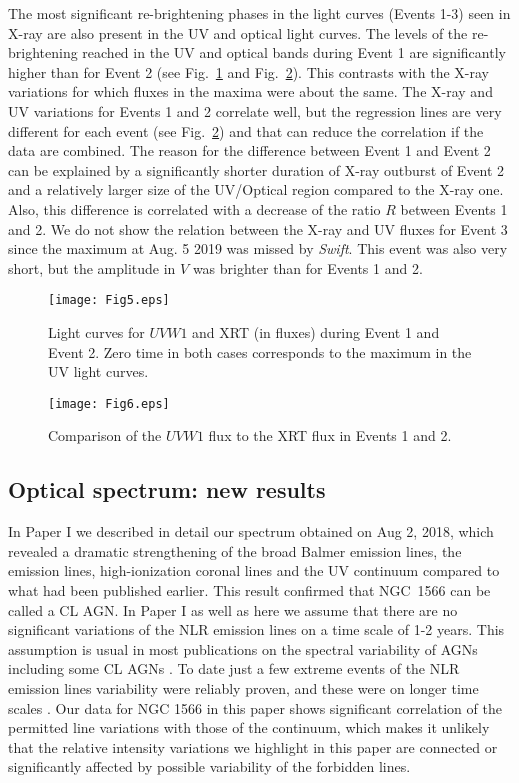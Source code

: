 \documentclass[fleqn,usenatbib]{mnras}
\begin{document}
The most significant re-brightening phases in the light curves  (Events 1-3) seen in X-ray are also present in the UV and optical light curves. The  levels of the re-brightening reached in the UV and optical bands during Event 1  are significantly higher than for Event 2 (see Fig.~\ref{fig6} and Fig.~\ref{fig7}). This contrasts with the X-ray variations for which fluxes in the maxima were about the same.  The X-ray and UV variations for Events 1 and 2 correlate well, but the regression lines are very different for each event (see Fig.~\ref{fig7}) and that can reduce the correlation if the data are combined. The reason for the difference between Event 1 and Event 2 can be explained by a significantly shorter duration of X-ray outburst of Event 2 and a relatively larger size of the UV/Optical region compared to the X-ray one. Also, this difference is correlated with a decrease of the ratio $R$  between Events 1 and 2. We do not show the relation between the X-ray and UV fluxes for Event 3 since the maximum at Aug. 5 2019 was missed by {\it Swift}. This event was also very short, but the amplitude in $V$  was brighter than for Events 1 and 2.

\begin{figure}
\centering
\texttt{[image: Fig5.eps]}
 \caption {Light curves for $UVW1$ and XRT (in fluxes) during Event 1 and Event 2. Zero time in both cases corresponds to the maximum in the UV light curves.}
    \label{fig6}
\end{figure}

\begin{figure}
\centering
\texttt{[image: Fig6.eps]}
 \caption {Comparison of the $UVW1$ flux to the XRT flux in Events 1 and 2.}
    \label{fig7}
\end{figure}


\subsection{Optical spectrum: new results}

In Paper I we described in detail our spectrum obtained on Aug 2, 2018, which revealed a dramatic strengthening of the broad Balmer emission lines, the  emission  lines, high-ionization coronal lines and the UV continuum compared to what had been published earlier. This result confirmed that NGC~1566 can be called a CL AGN.  In Paper I as well as here we assume that there are no significant variations of the NLR emission lines on a time scale of 1-2 years. This assumption is usual in most publications on the spectral variability of AGNs including some CL AGNs \citep[see e.g.,][]{Cohen1986,Shapovalova2019}. To date just a few extreme events of the NLR emission lines variability were reliably proven, and these were on longer time scales \citep[see e.g.,][]{Denney2014}. Our data for NGC 1566 in this paper shows significant correlation of the permitted line variations with those of the continuum, which makes it unlikely that the relative intensity variations we highlight in this paper are connected or significantly affected by possible variability of the forbidden lines. 
\end{document}
